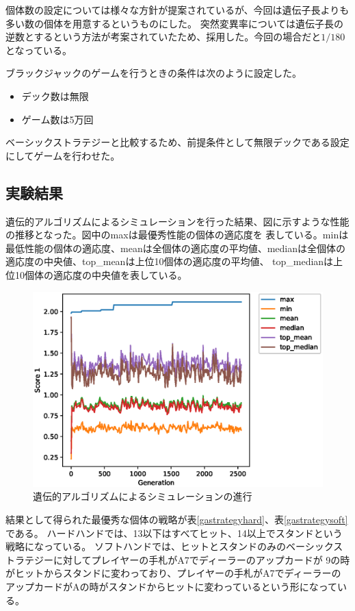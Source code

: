 個体数の設定については様々な方針が提案されているが、今回は遺伝子長よりも多い数の個体を用意するというものにした。
突然変異率については遺伝子長の逆数とするという方法が考案されていたため、採用した。今回の場合だと$1/180$となっている。

ブラックジャックのゲームを行うときの条件は次のように設定した。

\begin{itemize}
\item デック数は無限
\item ゲーム数は5万回
\end{itemize}

ベーシックストラテジーと比較するため、前提条件として無限デックである設定にしてゲームを行わせた。

\subsection{実験結果}
遺伝的アルゴリズムによるシミュレーションを行った結果、図に示すような性能の推移となった。図中のmaxは最優秀性能の個体の適応度を
表している。minは最低性能の個体の適応度、meanは全個体の適応度の平均値、medianは全個体の適応度の中央値、top\_meanは上位10個体の適応度の平均値、
top\_medianは上位10個体の適応度の中央値を表している。

  \begin{figure}[htbp]
    \includegraphics[width=14.0cm]{figure/gaprocess.eps}
    \caption{遺伝的アルゴリズムによるシミュレーションの進行}
    \label{gaprocess}
  \end{figure}

結果として得られた最優秀な個体の戦略が表\ref{gastrategyhard}、表\ref{gastrategysoft}である。
ハードハンドでは、13以下はすべてヒット、14以上でスタンドという戦略になっている。
ソフトハンドでは、ヒットとスタンドのみのベーシックストラテジーに対してプレイヤーの手札がA7でディーラーのアップカードが
9の時がヒットからスタンドに変わっており、プレイヤーの手札がA7でディーラーのアップカードがAの時がスタンドからヒットに変わっているという形になっている。

